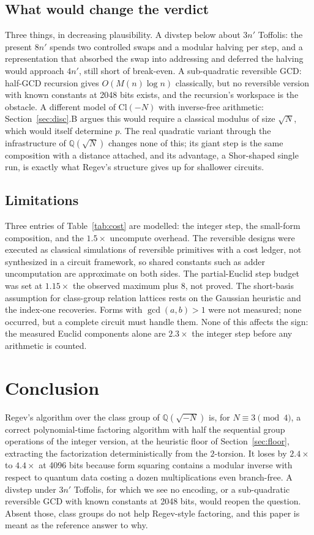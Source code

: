 \documentclass[conference]{IEEEtran}
\newcommand{\Cl}{\mathrm{Cl}}
\newcommand{\Q}{\mathbb{Q}}
\begin{document}
\subsection{What would change the verdict}
Three things, in decreasing plausibility. A divstep below about $3n'$ Toffolis: the present $8n'$ spends two controlled swaps and a modular halving per step, and a representation that absorbed the swap into addressing and deferred the halving would approach $4n'$, still short of break-even. A sub-quadratic reversible GCD: half-GCD recursion gives $O(M(n)\log n)$ classically, but no reversible version with known constants at 2048 bits exists, and the recursion's workspace is the obstacle. A different model of $\Cl(-N)$ with inverse-free arithmetic: Section~\ref{sec:disc}.B argues this would require a classical modulus of size $\sqrt N$, which would itself determine $p$. The real quadratic variant through the infrastructure of $\Q(\sqrt N)$ changes none of this; its giant step is the same composition with a distance attached, and its advantage, a Shor-shaped single run, is exactly what Regev's structure gives up for shallower circuits.

\subsection{Limitations}
Three entries of Table~\ref{tab:cost} are modelled: the integer step, the small-form composition, and the $1.5\times$ uncompute overhead. The reversible designs were executed as classical simulations of reversible primitives with a cost ledger, not synthesized in a circuit framework, so shared constants such as adder uncomputation are approximate on both sides. The partial-Euclid step budget was set at $1.15\times$ the observed maximum plus $8$, not proved. The short-basis assumption for class-group relation lattices rests on the Gaussian heuristic and the index-one recoveries. Forms with $\gcd(a,b)>1$ were not measured; none occurred, but a complete circuit must handle them. None of this affects the sign: the measured Euclid components alone are $2.3\times$ the integer step before any arithmetic is counted.

\section{Conclusion}
Regev's algorithm over the class group of $\Q(\sqrt{-N})$ is, for $N\equiv3\pmod4$, a correct polynomial-time factoring algorithm with half the sequential group operations of the integer version, at the heuristic floor of Section~\ref{sec:floor}, extracting the factorization deterministically from the $2$-torsion. It loses by $2.4\times$ to $4.4\times$ at 4096 bits because form squaring contains a modular inverse with respect to quantum data costing a dozen multiplications even branch-free. A divstep under $3n'$ Toffolis, for which we see no encoding, or a sub-quadratic reversible GCD with known constants at 2048 bits, would reopen the question. Absent those, class groups do not help Regev-style factoring, and this paper is meant as the reference answer to why.
\end{document}
